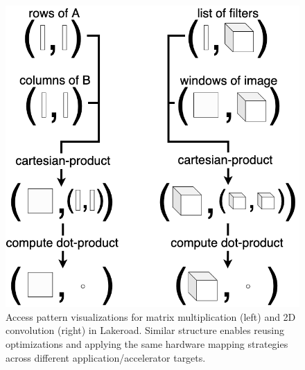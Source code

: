 \documentclass[prologue, dvipsnames, sigplan, screen, review, anonymous]{acmart}
\newcommand{\g}{Lakeroad\xspace}
\begin{document}
\begin{figure}
    \centering
    \includegraphics[width=0.7\linewidth]{matmul-conv2d-access-patterns.png}
    \caption{
        Access pattern visualizations for
        matrix multiplication (left) and
        2D convolution (right) in \g.
        Similar structure enables
        reusing optimizations and applying
        the same hardware mapping strategies
        across different application/accelerator
        targets.}
    \label{fig:matmul-conv2d-access-patterns}
    \vspace{-1em}
\end{figure}

%    


\end{document}
